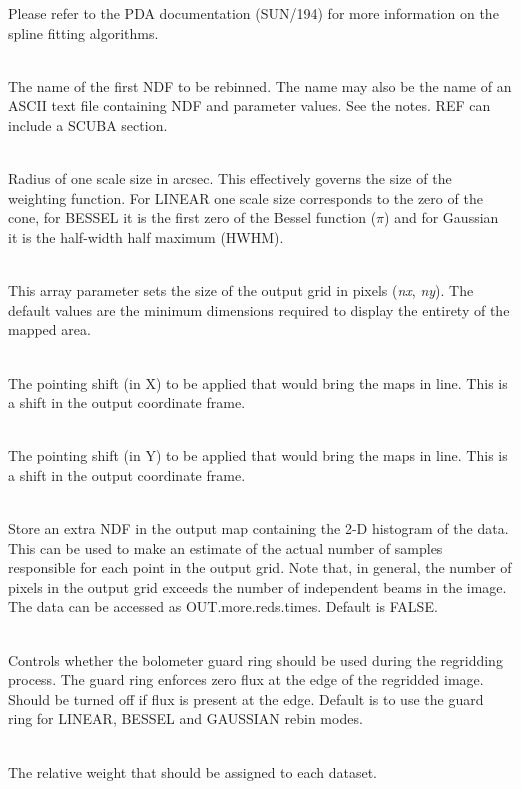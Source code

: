 \documentclass[twoside,11pt]{article}
\newcommand{\htmlref}[2]{#1}
\newcommand{\xref}[3]{#1}
\renewcommand{\_}{\texttt{\symbol{95}}}
\newcommand{\sstsubsection}[1]{ \item[{#1}] \mbox{} \\}
\newcommand{\sstsubsection}[1]{\item[{#1}]}
\begin{document}
{{{{         }
         Please refer to the PDA documentation 
         (\xref{SUN/194}{sun194}{}) for more information
         on the spline fitting algorithms.
      }
      \sstsubsection{
         REF = CHAR (Read)
      }{
         The name of the first NDF to be rebinned. The name may also be the
         name of an ASCII text file containing NDF and parameter values.
         See the notes. REF can include a \htmlref{SCUBA section}{sections}.
      }
      \sstsubsection{
         SCALE = REAL (Read)
      }{
         Radius of one scale size in arcsec. This effectively governs the
         size of the weighting function. For LINEAR one scale size corresponds
         to the zero of the cone, for BESSEL it is the first zero of the
         Bessel function ($\pi$) and for Gaussian it is the half-width
         half maximum (HWHM).
      }
      \sstsubsection{
         SIZE ( 2 ) = INTEGER (Read)
      }{
         This array parameter sets the size of the output grid in pixels
         (\textit{nx}, \textit{ny}). The default values are the minimum
         dimensions required to display the entirety of the mapped area.
      }
      \sstsubsection{
         SHIFT\_DX = REAL (Read)
      }{
         The pointing shift (in X) to be applied that would bring the
         maps in line. This is a shift in the output coordinate frame.
      }
      \sstsubsection{
         SHIFT\_DY = REAL (Read)
      }{
         The pointing shift (in Y) to be applied that would bring the
         maps in line. This is a shift in the output coordinate frame.
      }
      \sstsubsection{
         TIMES = LOGICAL (Read)
      }{
         Store an extra NDF in the output map containing the 2-D histogram
         of the data. This can be used to make an estimate of the actual
         number of samples responsible for each point in the output grid.
         Note that, in general, the number of pixels in the output grid
         exceeds the number of independent beams in the image.
         The data can be accessed as OUT.more.reds.times. Default is FALSE.
      }
      \sstsubsection{
         USEGRD = LOGICAL (Read)
      }{
            Controls whether the bolometer guard ring should be used during
   the regridding process. The guard ring enforces zero flux at the
   edge of the regridded image. Should be turned off if flux is present
   at the edge. Default is to use the guard ring for LINEAR, BESSEL
   and GAUSSIAN rebin modes.
      }
      \sstsubsection{
         WEIGHT = REAL (Read)
      }{
         The relative weight that should be assigned to each dataset.
      }
}}
\end{document}

